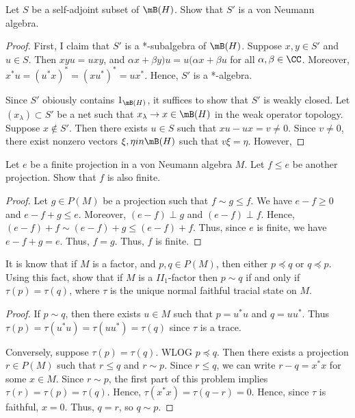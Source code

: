 \documentclass{article}
\begin{document}
 Let $S$ be a self-adjoint subset of $\mB(H)$. Show that $S'$ is a von Neumann algebra.
\begin{proof}
  First, I claim that $S'$ is a *-subalgebra of $\mB(H)$.  Suppose $x, y \in S'$ and $u \in S$.  Then $xyu = uxy$, and $\alpha x + \beta y) u = u (\alpha x + \beta u$ for all $\alpha, \beta \in \CC$.  Moreover,  $x^* u  = (u^* x)^* = (x u^*)^* = u x^*$.   Hence, $S'$ is a *-algebra.

  Since $S'$ obiously contains $1_{\mB(H)}$, it suffices to show that $S'$ is weakly closed.  Let $(x_\lambda) \subset S'$ be a net such that  $x_\lambda \to x \in \mB(H)$ in the weak operator topology.  Suppose $x \not\in S'$.  Then there exists $u \in S$ such that $x u - u x = v \neq 0$.  Since $v \neq 0$, there exist nonzero vectors $\xi, \eta in \mB(H)$ such that $v \xi = \eta$.  However,
\end{proof}

 Let $e$ be a finite projection in a von Neumann algebra $M$. Let $f \le e$ be another projection.  Show that $f$ is also finite.
\begin{proof}
  Let $g \in P(M)$ be a projection such that $f \sim g \le f$. We have $e - f \ge 0$ and $e - f + g \le e$.  Moreover, $(e - f) \perp g$ and $(e - f) \perp f$.  Hence,
  $(e - f) + f \sim (e -f) + g \le (e-f) + f$.
  Thus, since $e$ is finite, we have $e -f + g = e$.  Thus, $f = g$.  Thus, $f$ is finite.
\end{proof}


 It is know that if $M$ is a factor, and $p,q \in P(M)$, then either $p \preceq q$ or $q \preceq p$. Using this fact, show that if $M$ is a $II_1$-factor then $p \sim q$ if and only if $\tau(p) = \tau(q)$, where $\tau$ is the unique normal faithful tracial state on $M$.
\begin{proof}
  If $p \sim q$, then there exists $u \in M$ such that $p = u^*u$ and $q = u u^*$.  Thus $\tau(p) = \tau(u^* u) = \tau(u u^*) = \tau(q)$ since $\tau$ is a trace.

  Conversely, suppose $\tau(p) = \tau(q)$.  WLOG $p \preceq q$.  Then there exists a projection $r \in P(M)$ such that $r \le q$ and $r \sim p$.  Since $r \le q$, we can write $r - q = x^* x$ for some $x \in M$.  Since $r \sim p$, the first part of this problem implies $\tau(r) = \tau(p) = \tau(q)$.  Hence, $\tau(x^*x) = \tau(q - r) = 0$. Hence, since $\tau$ is faithful, $x = 0$.  Thus, $q = r$, so $q \sim p$.
\end{proof}
\end{document}
